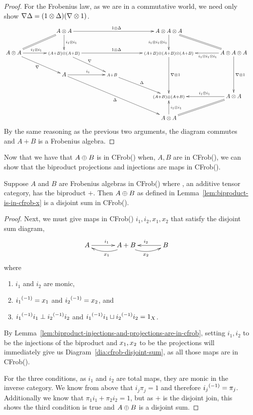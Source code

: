 \begin{proof}
  For the Frobenius law, as we are in a commutative world, we need only show
  $\nabla \Delta = (1\otimes\Delta)(\nabla\otimes1)$.
  \[
  \xymatrix@C+17pt{
      &A\*A \ar@{=}[ld] \ar[rr]^{1\*\Delta} \ar[d]^{i_1\*i_1} && A\*A\*A  \ar[d]_{i_1\*i_1\*i_1} \ar@{=}[dr] \\
      A\*A \ar[r]^(.45){i_1\*i_1}  \ar[dr]_{\nabla}
         &\scriptstyle{(A+B)\*(A+B)} \ar[rr]^{1\*\Delta} \ar[dr]^{\nabla}
         &&\scriptstyle{(A+B)\*(A+B)\*(A+B)}  \ar[dd]^{\nabla\*1} & A\*A\*A  \ar[l]^(.4){i_1\*i_1\*i_1}  \ar[dd]^{\nabla\*1}\\
     & A \ar[r]^{i_1} \ar[ddrr]_{\Delta} & \scriptstyle{A+B} \ar[dr]^{\Delta} \\
     & & & \scriptstyle{(A+B)\*(A+B)} & A\*A  \ar[l]_(.45){i_1\*i_1} \ar@{=}[dl]\\
     & & & A\*A \ar[u]_{i_1\*i_1}
    }
  \]
  By the same reasoning as the previous two arguments, the diagram commutes and $A+B$ is a Frobenius
  algebra.
\end{proof}

Now that we have that $A\oplus B$ is in CFrob(\X) when, $A,B$ are in CFrob(\X), we can show that the
biproduct projections and injections are maps in CFrob(\X).


\begin{proposition}\label{prop:cfrobx_has_disjoint_sums}
  Suppose $A$ and $B$ are Frobenius algebras in CFrob(\X) where \X, an additive tensor category, has
  the biproduct $+$.
  Then $A\oplus B$ as defined in Lemma~\ref{lem:biproduct-is-in-cfrob-x} is a disjoint sum in CFrob(\X).
\end{proposition}
\begin{proof}
  Next, we must give maps in CFrob(\X) $i_1,i_2,x_1,x_2$ that satisfy the disjoint sum diagram,
  \begin{equation}
    \xymatrix@C+10pt{
      A\ar[r]^{i_1} &A+B\ar@/^9pt/[l]^{x_1} \ar@/_9pt/[r]_{x_2} & B \ar[l]_{i_2}
    }\label{dia:cfrob-disjoint-sum}
  \end{equation}
  where
  \begin{enumerate}[{(}i{)}]
    \item $i_1$ and $i_2$ are monic,
    \item ${i_1}^{(-1)} = x_1$ and ${i_2}^{(-1)} = x_2$, and
    \item ${i_1}^{(-1)}i_1 \perp {i_2}^{(-1)}i_2$ and ${i_1}^{(-1)}i_1 \sqcup {i_2}^{(-1)}i_2 = 1_X$.
  \end{enumerate}

  By Lemma~\ref{lem:biproduct-injections-and-projections-are-in-cfrob}, setting $i_1,i_2$ to be the
  injections of the biproduct and $x_1,x_2$ to be the projections will immediately give us
  Diagram~\ref{dia:cfrob-disjoint-sum}, as all those maps are in CFrob(\X).

  For the three conditions, as $i_1$ and $i_2$ are total maps, they are monic in the inverse
  category. We know from above that $i_j\pi_j = 1$ and therefore ${i_j}^{(-1)} = \pi_j$. Additionally
  we know that $\pi_1i_1 + \pi_2i_2 = 1$, but as $+$ is the disjoint join, this shows the third
  condition is true and $A\oplus B$ is a disjoint sum.
\end{proof}


